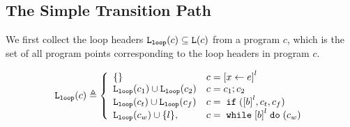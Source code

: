 \subsection{The Simple Transition Path}
We first collect the loop headers $\mathtt{L}_{\mathtt{loop}}(c) \subseteq \mathtt{L}(c)$ from a program $c$, which is the set of all program points corresponding to the loop headers in program $c$.
\begin{defn}
  \label{def:loopl}
  \[
  \loopl(c) \triangleq 
  \left\{
    \begin{array}{ll}
      \{\}  & {c} = \clabel{\assign x e}^{l} \\
      \loopl({c_1}) \cup \loopl({{c_2}})  & {c} = {c_1};{c_2} \\
      \loopl(c_t) \cup \loopl({{c_f}})   & {c} =\eif(\clabel{\bexpr}^{l}, c_t, c_f) \\
  \loopl(c_w) \cup \{l\}, &  {c}   = \ewhile \clabel{\bexpr}^{l} \edo (c_w)
  \end{array}
\right.
\]
  \end{defn}

